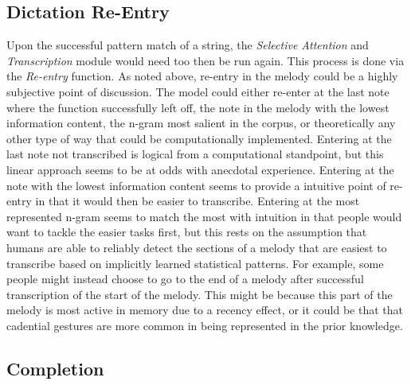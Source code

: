 \documentclass[]{book}
\theoremstyle{definition}
\theoremstyle{definition}
\theoremstyle{definition}
\theoremstyle{remark}
\begin{document}
\hypertarget{dictation-re-entry}{%
\subsection{Dictation Re-Entry}\label{dictation-re-entry}}

Upon the successful pattern match of a string, the \emph{Selective
Attention} and \emph{Transcription} module would need too then be run
again. This process is done via the \emph{Re-entry} function. As noted
above, re-entry in the melody could be a highly subjective point of
discussion. The model could either re-enter at the last note where the
function successfully left off, the note in the melody with the lowest
information content, the n-gram most salient in the corpus, or
theoretically any other type of way that could be computationally
implemented. Entering at the last note not transcribed is logical from a
computational standpoint, but this linear approach seems to be at odds
with anecdotal experience. Entering at the note with the lowest
information content seems to provide a intuitive point of re-entry in
that it would then be easier to transcribe. Entering at the most
represented n-gram seems to match the most with intuition in that people
would want to tackle the easier tasks first, but this rests on the
assumption that humans are able to reliably detect the sections of a
melody that are easiest to transcribe based on implicitly learned
statistical patterns. For example, some people might instead choose to
go to the end of a melody after successful transcription of the start of
the melody. This might be because this part of the melody is most active
in memory due to a recency effect, or it could be that that cadential
gestures are more common in being represented in the prior knowledge.

\hypertarget{completion}{%
\subsection{Completion}\label{completion}}
\end{document}
